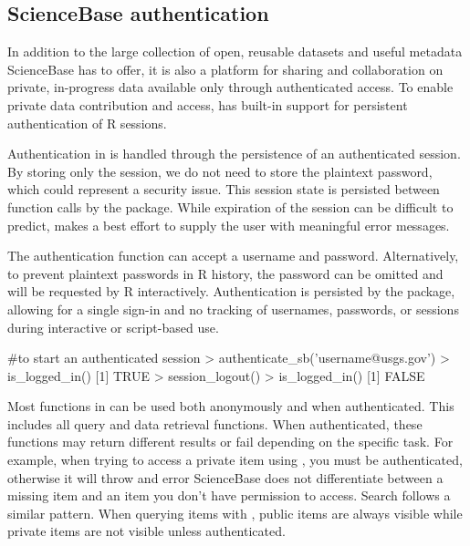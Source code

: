 \subsection{ScienceBase authentication}
In addition to the large collection of open, reusable datasets and 
useful metadata ScienceBase has to offer, it is
also a platform for sharing and collaboration on private, in-progress 
data available only through authenticated access. To enable 
private data contribution and access, 
 has built-in support for persistent 
authentication of R sessions. 

Authentication in  is handled through the persistence of 
an authenticated session. By storing only the session, we do not need to 
store the plaintext password, which could represent a security issue. This
session state is persisted between function calls by the package. While  
expiration of the session can be difficult to predict, 
makes a best effort to supply the user with meaningful error messages.

The authentication function  can accept a username
and password. Alternatively, to prevent plaintext passwords in R history, 
the password can be omitted and will be requested by R interactively. 
Authentication is persisted by the package, allowing for a single sign-in
and no tracking of usernames, passwords, or sessions during interactive or
script-based use. 

\begin{example}
#to start an authenticated session
> authenticate_sb('username@usgs.gov')
> is_logged_in()
[1] TRUE
> session_logout()
> is_logged_in()
[1] FALSE
\end{example}

Most functions in  can be used both anonymously and when
authenticated. This includes all query and data retrieval functions. 
When authenticated, these functions may return different results or fail
depending on the specific task. For example, when trying to access 
a private item using , you must be authenticated, otherwise
it will throw and error ScienceBase does not differentiate between a missing
item and an item you don't have permission to access. Search follows a similar
pattern. When querying items with , public items are always 
visible while private items are not visible unless authenticated. 

